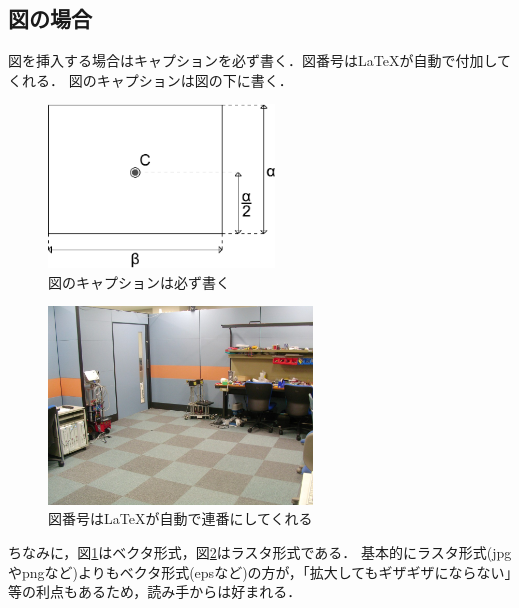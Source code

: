 \documentclass[11pt, a4paper]{jarticle}
\begin{document}
\subsection{図の場合}
図を挿入する場合はキャプションを必ず書く．図番号は\LaTeX が自動で付加してくれる．
図のキャプションは図の下に書く．


\begin{figure}[b] %
	\begin{center}
	\includegraphics[width=60mm]{figure1.pdf} %
	\caption{図のキャプションは必ず書く} %
	\label{figure1} %
	\end{center}
\end{figure}
\begin{figure}[tb] %
	\begin{center}
	\includegraphics[width=70mm]{figure2.jpg}
	\caption{図番号は\LaTeX が自動で連番にしてくれる}
	\label{figure2}
	\end{center}
\end{figure}
ちなみに，図\ref{figure1}はベクタ形式，図\ref{figure2}はラスタ形式である．
基本的にラスタ形式(jpgやpngなど)よりもベクタ形式(epsなど)の方が，「拡大してもギザギザにならない」等の利点もあるため，読み手からは好まれる．

\pagebreak %
\end{document}
